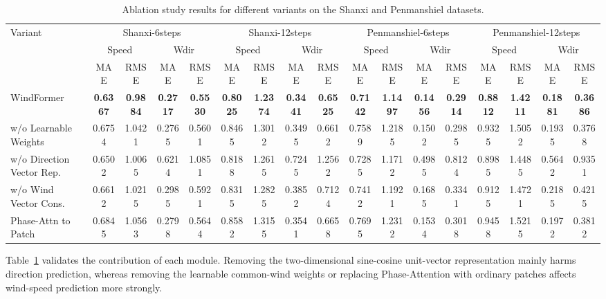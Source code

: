 \begin{table}[!t]
\caption{Ablation study results for different variants on the Shanxi and Penmanshiel datasets.}
\label{tab:ablation}
\centering
\scriptsize
\setlength{\tabcolsep}{3.2pt}
\renewcommand{\arraystretch}{1.08}
\begin{adjustbox}{max width=\textwidth}
\begin{tabular}{l|cccc|cccc|cccc|cccc}
\toprule
\multirow{3}{*}{Variant}
& \multicolumn{4}{c|}{Shanxi-6steps}
& \multicolumn{4}{c|}{Shanxi-12steps}
& \multicolumn{4}{c|}{Penmanshiel-6steps}
& \multicolumn{4}{c}{Penmanshiel-12steps} \\
\cline{2-17}
& \multicolumn{2}{c}{Speed} & \multicolumn{2}{c|}{Wdir}
& \multicolumn{2}{c}{Speed} & \multicolumn{2}{c|}{Wdir}
& \multicolumn{2}{c}{Speed} & \multicolumn{2}{c|}{Wdir}
& \multicolumn{2}{c}{Speed} & \multicolumn{2}{c}{Wdir} \\
\cline{2-17}
& MAE & RMSE & MAE & RMSE
& MAE & RMSE & MAE & RMSE
& MAE & RMSE & MAE & RMSE
& MAE & RMSE & MAE & RMSE \\
\midrule
WindFormer
& \textbf{0.6367} & \textbf{0.9884} & \textbf{0.2717} & \textbf{0.5530}
& \textbf{0.8025} & \textbf{1.2374} & \textbf{0.3441} & \textbf{0.6525}
& \textbf{0.7142} & \textbf{1.1497} & \textbf{0.1456} & \textbf{0.2914}
& \textbf{0.8812} & \textbf{1.4211} & \textbf{0.1881} & \textbf{0.3686} \\
w/o Learnable Weights
& 0.6754 & 1.0421 & 0.2765 & 0.5601
& 0.8465 & 1.3012 & 0.3495 & 0.6612
& 0.7589 & 1.2185 & 0.1502 & 0.2985
& 0.9325 & 1.5052 & 0.1935 & 0.3768 \\
w/o Direction Vector Rep.
& 0.6502 & 1.0065 & 0.6214 & 1.0851
& 0.8188 & 1.2615 & 0.7245 & 1.2562
& 0.7285 & 1.1712 & 0.4985 & 0.8124
& 0.8985 & 1.4485 & 0.5642 & 0.9351 \\
w/o Wind Vector Cons.
& 0.6612 & 1.0215 & 0.2985 & 0.5921
& 0.8315 & 1.2825 & 0.3852 & 0.7124
& 0.7412 & 1.1921 & 0.1685 & 0.3341
& 0.9125 & 1.4721 & 0.2185 & 0.4215 \\
Phase-Attn to Patch
& 0.6845 & 1.0563 & 0.2798 & 0.5644
& 0.8582 & 1.3155 & 0.3541 & 0.6658
& 0.7695 & 1.2312 & 0.1534 & 0.3018
& 0.9458 & 1.5215 & 0.1972 & 0.3812 \\
\bottomrule
\end{tabular}
\end{adjustbox}
\end{table}

Table~\ref{tab:ablation} validates the contribution of each module. Removing the two-dimensional sine-cosine unit-vector representation mainly harms direction prediction, whereas removing the learnable common-wind weights or replacing Phase-Attention with ordinary patches affects wind-speed prediction more strongly.
